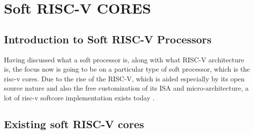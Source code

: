 \documentclass[conference]{IEEEtran}
\begin{document}
\section{Soft RISC-V CORES}
\subsection{Introduction to Soft RISC-V Processors}
Having discussed what a soft processor is, along with what RISC-V architecture is, the focus now is going to be on a particular type of soft processor, which is the risc-v cores. Due to the rise of the RISC-V, which is aided especially by its open source nature and also the free customization of its ISA and micro-architecture, a lot of risc-v softcore implementation exists today \cite{6}.


\subsection{Existing soft RISC-V cores}
\end{document}
